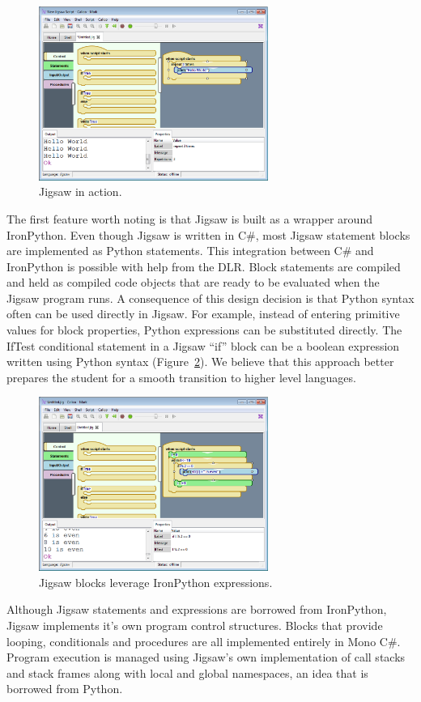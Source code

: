 \documentclass[preprint]{sigplanconf}
\begin{document}
\begin{figure}[h!]
  \centering
     \includegraphics[width=75mm]{jigsaw1.eps}
  \caption{Jigsaw in action.}
  \label{jigsaw1}
\end{figure}

The first feature worth noting is that Jigsaw is built as a
wrapper around IronPython. Even though Jigsaw is written in C\#, most
Jigsaw statement blocks are implemented as Python statements. This
integration between C\# and IronPython is possible with help from the
DLR. Block statements are compiled and held as compiled code objects
that are ready to be evaluated when the Jigsaw program runs. A
consequence of this design decision is that Python syntax often can be
used directly in Jigsaw. For example, instead of entering primitive
values for block properties, Python expressions can be substituted
directly. The IfTest conditional statement in a Jigsaw ``if'' block can be a
boolean expression written using Python syntax (Figure~\ref{jigsaw2}). We believe
that this approach better prepares the student for a smooth transition
to higher level languages.

\begin{figure}[h!]
  \centering
    \includegraphics[width=75mm]{jigsaw2.eps} 
  \caption{Jigsaw blocks leverage IronPython expressions.}
  \label{jigsaw2}
\end{figure}

Although Jigsaw statements and expressions are borrowed from
IronPython, Jigsaw implements it’s own program control
structures. Blocks that provide looping, conditionals and procedures
are all implemented entirely in Mono C\#. Program execution is managed
using Jigsaw's own implementation of call stacks and stack frames
along with local and global namespaces, an idea that is borrowed from
Python.
\end{document}
